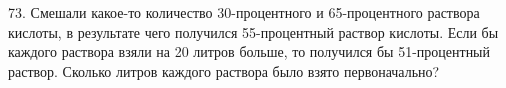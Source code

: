 73. Смешали какое-то количество 30-процентного и 65-процентного раствора кислоты, в результате чего получился 55-процентный раствор кислоты. Если бы каждого раствора взяли на 20 литров больше, то получился бы 51-процентный раствор. Сколько литров каждого раствора было взято первоначально?\\
